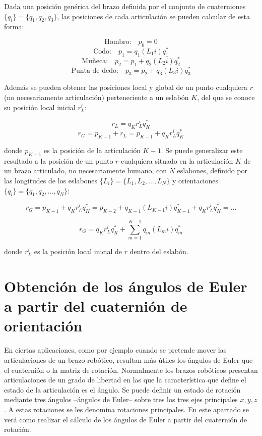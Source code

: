 \documentclass[12pt, a4paper]{report}
\begin{document}
Dada una posición genérica del brazo definida por el conjunto de cuaterniones $\{q_i\} = \{q_1, q_2, q_3\}$, las posiciones de cada articulación se pueden calcular de esta forma:

$$ \text{Hombro:} \quad p_0 = 0 $$
$$ \text{Codo:} \quad p_1 = q_1(L_1i)q_1^* $$
$$ \text{Muñeca:} \quad p_2 = p_1 + q_2(L_2i)q_2^* $$
$$ \text{Punta de dedo:} \quad p_3 = p_2 + q_3(L_3i)q_3^* $$

Además se pueden obtener las posiciones local y global de un punto cualquiera $r$ (no necesariamente articulación) perteneciente a un eslabón $K$, del que se conoce su posición local inicial $r_L^i$:

$$ r_L = q_Kr_L^iq_K^* $$
$$ r_G = p_{K-1} + r_L = p_{K-1} + q_Kr_L^iq_K^* $$

donde $p_{K-1}$ es la posición de la articulación $K-1$. Se puede generalizar este resultado a la posición de un punto $r$ cualquiera situado en la articulación $K$ de un brazo articulado, no necesariamente humano, con $N$ eslabones, definido por las longitudes de los eslabones $\{L_i\} = \{L_1, L_2, \ldots , L_N\}$ y orientaciones $\{q_i\} = \{q_1, q_2, \ldots, q_N\}$:

$$ r_G = p_{K-1} + q_Kr_L^iq_K^* = p_{K-2} +  q_{K-1} (L_{K-1}i) q_{K-1}^* + q_K r_L^i q_K^* = \ldots $$

\begin{equation}
r_G = q_Kr_L^iq_K^* + \sum\limits_{m = 1}^{K-1} q_m (L_mi) q_m^*
\end{equation}

donde $r_L^i$ es la posición local inicial de $r$ dentro del eslabón.

\section{Obtención de los ángulos de Euler a partir del cuaternión de orientación}

En ciertas aplicaciones, como por ejemplo cuando se pretende mover las articulaciones de un brazo robótico, resultan más útiles los ángulos de Euler que el cuaternión o la matriz de rotación. Normalmente los brazos robóticos presentan articulaciones de un grado de libertad en las que la característica que define el estado de la articulación es el ángulo. Se puede definir un estado de rotación mediante tres ángulos --ángulos de Euler-- sobre tres los tres ejes principales $x, y, z$. A estas rotaciones se les denomina rotaciones principales. En este apartado se verá como realizar el cálculo de los ángulos de Euler a partir del cuaternión de rotación. \\
\end{document}
